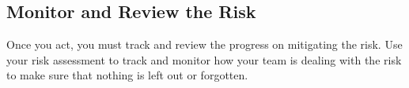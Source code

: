 \documentclass[a4paper,12pt]{article}
\begin{document}
\subsection{Monitor and Review the Risk}
Once you act, you must track and review the progress on mitigating the risk. Use your risk assessment to track and monitor how your team is dealing with the risk to make sure that nothing is left out or forgotten.


\clearpage

\printindex
\end{document}
